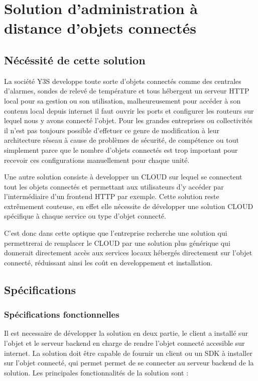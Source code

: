 \chapter{Solution d'administration à distance d'objets connectés}
\label{sec:content}

\section{Nécéssité de cette solution}

La société Y3S developpe toute sorte d'objets connectés comme des centrales d'alarmes, sondes de relevé de température et tous hébergent un serveur HTTP local pour sa gestion ou son utilisation, malheureusement pour accéder à son contenu local depuis internet il faut ouvrir les ports et configurer les routeurs sur lequel nous y avons connecté l'objet. Pour les grandes entreprises ou collectivités il n'est pas toujours possible d'effetuer ce genre de modification à leur architecture réseau à cause de problèmes de sécurité, de compétence ou tout simplement parce que le nombre d'objets connectés est trop important pour recevoir ces configurations manuellement pour chaque unité.

Une autre solution consiste à developper un CLOUD sur lequel se connectent tout les objets connectés et permettant aux utilisateurs d'y accéder par l'intermédiaire d'un frontend HTTP par exemple. Cette solution reste extrêmement couteuse, en effet elle nécessite de développer une solution CLOUD spécifique à chaque service ou type d'objet connecté.

C'est donc dans cette optique que l'entreprise recherche une solution qui permettrerai de remplacer le CLOUD par une solution plus générique qui donnerait directement accès aux services locaux hébergés directement sur l'objet connecté, réduissant ainsi les coût en developpement et installation.

\section{Spécifications}

\subsection{Spécifications fonctionnelles}

Il est necessaire de développer la solution en deux partie, le client a installé sur l'objet et le serveur backend en charge de rendre l'objet connecté accesible sur internet. La solution doit être capable de fournir un client ou un SDK à installer sur l'objet connecté, qui permet permet de se connecter au serveur backend de la solution. Les principales fonctionnalités de la solution sont :

